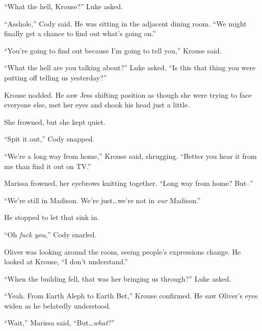 ``What the hell, Krouse?'' Luke asked.



``Asshole,'' Cody said.  He was sitting in the adjacent dining room.  ``We might finally get a chance to find out what's going on.''



``You're going to find out because I'm going to tell you,'' Krouse said.



``What the hell are you talking about?'' Luke asked.  ``Is this that thing you were putting off telling us yesterday?''



Krouse nodded.  He saw Jess shifting position as though she were trying to face everyone else, met her eyes and shook his head just a little.



She frowned, but she kept quiet.



``Spit it out,'' Cody snapped.



``We're a long way from home,'' Krouse said, shrugging.  ``Better you hear it from me than find it out on TV.''



Marissa frowned, her eyebrows knitting together.  ``Long way from home?  But--''



``We're still in Madison.  We're just\ldots we're not in \emph{our} Madison.''



He stopped to let that sink in.



``Oh \emph{fuck you},'' Cody snarled.



Oliver was looking around the room, seeing people's expressions change.  He looked at Krouse, ``I don't understand.''



``When the building fell, that was her bringing us through?'' Luke asked.



``Yeah.  From Earth Aleph to Earth Bet,'' Krouse confirmed.  He saw Oliver's eyes widen as he belatedly understood.



``Wait,'' Marissa said, ``But\ldots \emph{what}?''



